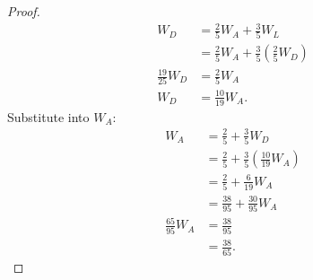 \documentclass[a4paper]{article}
\begin{document}
\begin{enumerate}
\begin{proof}
 \begin{align*}
  W_D &= \frac{2}{5} W_A + \frac{3}{5}W_L \\
      &= \frac{2}{5} W_A + \frac{3}{5}\left( \frac{2}{5} W_D  \right) \\
  \frac{19}{25} W_D  &= \frac{2}{5}W_A  \\
  W_D &= \frac{10}{19}W_A
.\end{align*}
Substitute into $W_A$:
\begin{align*}
  W_A &= \frac{2}{5} + \frac{3}{5} W_D \\
      &= \frac{2}{5} + \frac{3}{5} \left( \frac{10}{19} W_A \right) \\
      &= \frac{2}{5} + \frac{6}{19} W_A \\
      &= \frac{38}{95} + \frac{30}{95} W_A\\
   \frac{65}{95} W_A &= \frac{38}{95} \\
                     &= \frac{38}{65}
.\end{align*}
\end{proof}
\end{enumerate}
\end{document}
